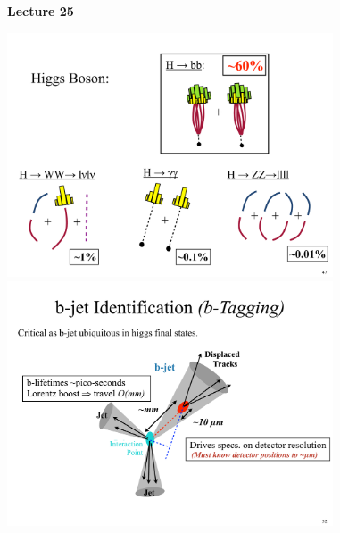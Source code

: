 
\usepackage{braket}
\usepackage{bbm}
\usepackage{relsize}
\usepackage{tcolorbox}




\usepackage{fancyhdr}

\fancyhf{}


\thispagestyle{fancy}

\begin{center}
{\huge \textbf{Lecture 25}}
\end{center}

{\fontsize{14}{16}\selectfont

\bc
\includegraphics[width=0.725\textwidth]{./HiggsBosonDecays.pdf}
\ec
\lineacross
\bc
\includegraphics[width=0.725\textwidth]{./BTagging.pdf}
\ec

\clearpage

}
